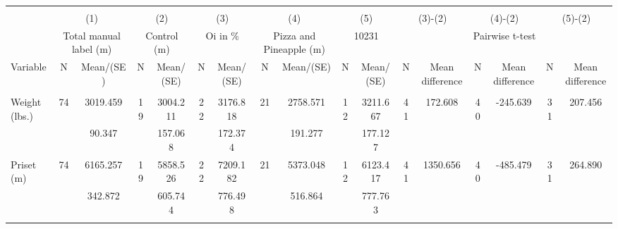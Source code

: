 
\begin{tabular}{@{\extracolsep{5pt}}lcccccccccccccccc}
\\[-1.8ex]\hline \hline \\[-1.8ex]
 & \multicolumn{2}{c}{(1)}  & \multicolumn{2}{c}{(2)}  & \multicolumn{2}{c}{(3)}  & \multicolumn{2}{c}{(4)}  & \multicolumn{2}{c}{(5)}  & \multicolumn{2}{c}{(3)-(2)} & \multicolumn{2}{c}{(4)-(2)} & \multicolumn{2}{c}{(5)-(2)} \\
 & \multicolumn{2}{c}{Total manual label (m)}  & \multicolumn{2}{c}{Control (m)}  & \multicolumn{2}{c}{Oi in \%}  & \multicolumn{2}{c}{Pizza and Pineapple (m)}  & \multicolumn{2}{c}{10231}  & \multicolumn{6}{c}{Pairwise t-test}  \\
Variable & N & Mean/(SE) & N & Mean/(SE) & N & Mean/(SE) & N & Mean/(SE) & N & Mean/(SE) & N & Mean difference & N & Mean difference & N & Mean difference \\ \hline \\[-1.8ex] 
Weight (lbs.)   & 74    &  3019.459    & 19    &  3004.211    & 22    &  3176.818    & 21    &  2758.571    & 12    &  3211.667    & 41    &   172.608    & 40    &  -245.639    & 31    &   207.456   \\
 &   &    90.347  &   &   157.068  &   &   172.374  &   &   191.277  &   &   177.127  &   &  &   &  &   &   \\
Priset (m)   & 74    &  6165.257    & 19    &  5858.526    & 22    &  7209.182    & 21    &  5373.048    & 12    &  6123.417    & 41    &  1350.656    & 40    &  -485.479    & 31    &   264.890   \\
 &   &   342.872  &   &   605.744  &   &   776.498  &   &   516.864  &   &   777.763  &   &  &   &  &   &   \\
\hline \\[-1.8ex]

\end{tabular}
